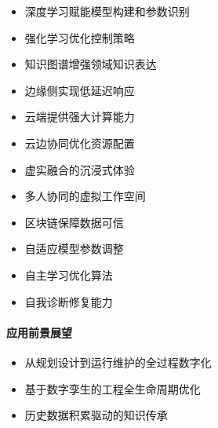 
\begin{itemize}
\tightlist
\item
  深度学习赋能模型构建和参数识别
\item
  强化学习优化控制策略
\item
  知识图谱增强领域知识表达
\end{itemize}


\begin{itemize}
\tightlist
\item
  边缘侧实现低延迟响应
\item
  云端提供强大计算能力
\item
  云边协同优化资源配置
\end{itemize}


\begin{itemize}
\tightlist
\item
  虚实融合的沉浸式体验
\item
  多人协同的虚拟工作空间
\item
  区块链保障数据可信
\end{itemize}


\begin{itemize}
\tightlist
\item
  自适应模型参数调整
\item
  自主学习优化算法
\item
  自我诊断修复能力
\end{itemize}

\hypertarget{ux5e94ux7528ux524dux666fux5c55ux671b}{%
\paragraph{应用前景展望}\label{ux5e94ux7528ux524dux666fux5c55ux671b}}


\begin{itemize}
\tightlist
\item
  从规划设计到运行维护的全过程数字化
\item
  基于数字孪生的工程全生命周期优化
\item
  历史数据积累驱动的知识传承
\end{itemize}


